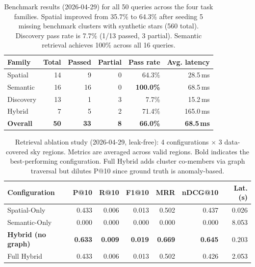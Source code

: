 \begin{table}[htbp]
\centering
\caption{Benchmark results (2026-04-29) for all 50 queries across the four task families. Spatial improved from 35.7\% to 64.3\% after seeding 5 missing benchmark clusters with synthetic stars (560 total). Discovery pass rate is 7.7\% (1/13 passed, 3 partial). Semantic retrieval achieves 100\% across all 16 queries.}
\label{tab:benchmark}
\begin{tabular}{lrrrrr}
\toprule
\textbf{Family} & \textbf{Total} & \textbf{Passed} & \textbf{Partial} & \textbf{Pass rate} & \textbf{Avg. latency} \\
\midrule
Spatial   & 14 &  9 &  0 & 64.3\%  & 28.5\,ms \\
Semantic  & 16 & 16 &  0 & \textbf{100.0\%} & 68.5\,ms \\
Discovery & 13 &  1 &  3 &  7.7\%  & 15.2\,ms \\
Hybrid    &  7 &  5 &  2 & 71.4\%  & 165.0\,ms \\
\midrule
\textbf{Overall} & \textbf{50} & \textbf{33} & \textbf{8} & \textbf{66.0\%} & \textbf{68.5\,ms} \\
\bottomrule
\end{tabular}
\end{table}

\begin{table}[htbp]
\centering
\caption{Retrieval ablation study (2026-04-29, leak-free): 4 configurations $\times$ 3 data-covered sky regions. Metrics are averaged across valid regions. Bold indicates the best-performing configuration. Full Hybrid adds cluster co-members via graph traversal but dilutes P@10 since ground truth is anomaly-based.}
\label{tab:ablation}
\begin{tabular}{lrrrrrr}
\toprule
\textbf{Configuration} & \textbf{P@10} & \textbf{R@10} & \textbf{F1@10} & \textbf{MRR} & \textbf{nDCG@10} & \textbf{Lat. (s)} \\
\midrule
Spatial-Only                    & 0.433 & 0.006 & 0.013 & 0.502 & 0.437 & 0.026 \\
Semantic-Only                   & 0.000 & 0.000 & 0.000 & 0.000 & 0.000 & 8.053 \\
\textbf{Hybrid (no graph)}      & \textbf{0.633} & \textbf{0.009} & \textbf{0.019} & \textbf{0.669} & \textbf{0.645} & 0.203 \\
Full Hybrid                     & 0.433 & 0.006 & 0.013 & 0.502 & 0.426 & 2.053 \\
\bottomrule
\end{tabular}
\end{table}

